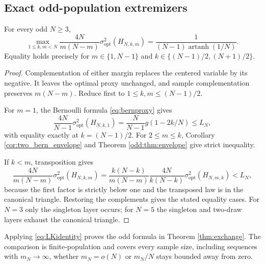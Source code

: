 \subsection{Exact odd-population extremizers}
\begin{theorem}\label{odd:thm:odd}
For every odd $N\ge3$,
\begin{equation}\label{odd:eq:exact}
 \boxed{\quad
 \max_{1\le k,m<N}\frac{4N}{m(N-m)}\sigma^2_{\mathrm{opt}}(H_{N,k,m})
 =\frac{1}{(N-1)\operatorname{artanh}(1/N)}.\quad}
\end{equation}
Equality holds precisely for $m\in\{1,N-1\}$ and $k\in\{(N-1)/2,(N+1)/2\}$.
\end{theorem}
\begin{proof}
Complementation of either margin replaces the centered variable by its negative. It leaves the optimal proxy unchanged, and sample complementation preserves $m(N-m)$. Reduce first to $1\le k,m\le(N-1)/2$.

For $m=1$, the Bernoulli formula \eqref{eq:bernproxy} gives
\[
 \frac{4N}{N-1}\sigma^2_{\mathrm{opt}}(H_{N,k,1})
 =\frac{N}{N-1}g(1-2k/N)\le L_N,
\]
with equality exactly at $k=(N-1)/2$. For $2\le m\le k$, Corollary \ref{cor:two_bern_envelope} and Theorem \ref{odd:thm:envelope} give strict inequality.

If $k<m$, transposition gives
\[
 \frac{4N}{m(N-m)}\sigma^2_{\mathrm{opt}}(H_{N,k,m})
 =\frac{k(N-k)}{m(N-m)}
 \frac{4N}{k(N-k)}\sigma^2_{\mathrm{opt}}(H_{N,m,k})<L_N,
\]
because the first factor is strictly below one and the transposed law is in the canonical triangle. Restoring the complements gives the stated equality cases. For $N=3$ only the singleton layer occurs; for $N=5$ the singleton and two-draw layers exhaust the canonical triangle.
\end{proof}

Applying \eqref{eq:LKidentity} proves the odd formula in Theorem \ref{thm:exchange}. The comparison is finite-population and covers every sample size, including sequences with $m_N\to\infty$, whether $m_N=o(N)$ or $m_N/N$ stays bounded away from zero.
